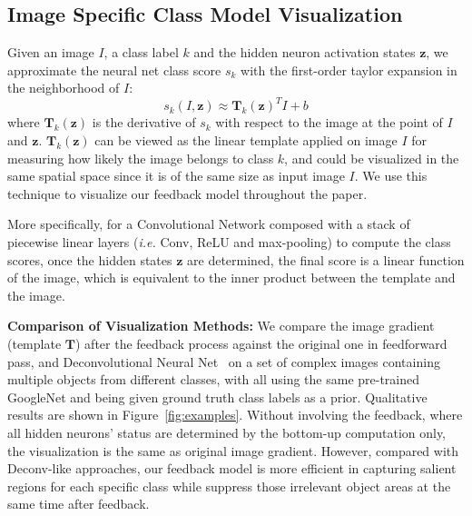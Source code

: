 \subsection{Image Specific Class Model Visualization}
\label{subsec:visualization}
Given an image $I$, a class label $k$ and the hidden neuron activation states $\mathbf{z}$, we approximate the neural net class score $s_k$ with the first-order taylor expansion in the neighborhood of $I$:
\begin{equation}
  s_k(I, \mathbf{z}) \approx  \mathbf{T}_k(\mathbf{z})^T I + b
\end{equation}
where $\mathbf{T}_k(\mathbf{z})$ is the derivative of $s_k$ with respect to the image at the point of $I$ and $\mathbf{z}$. $\mathbf{T}_k(\mathbf{z})$ can be viewed as the linear template applied on image $I$ for measuring how likely the image belongs to class $k$, and could be visualized in the same spatial space since it is of the same size as input image $I$.
We use this technique to visualize our feedback model throughout the paper.

More specifically, for a Convolutional Network composed with a stack of piecewise linear layers (\emph{i.e.} Conv, ReLU and max-pooling) to compute the class scores, once the hidden states $\mathbf{z}$ are determined, the final score is a linear function of the image, which is equivalent to the inner product between the template and the image.

\textbf{Comparison of Visualization Methods:} We compare the image gradient (template $\mathbf{T}$) after the feedback process against the original one in feedforward pass, and Deconvolutional Neural Net~\cite{zeiler2014visualizing} on a set of complex images containing multiple objects from different classes, with all using the same pre-trained GoogleNet and being given ground truth class labels as a prior. Qualitative results are shown in Figure~\ref{fig:examples}. Without involving the feedback, where all hidden neurons' status are determined by the bottom-up computation only, the visualization is the same as original image gradient. However, compared with Deconv-like approaches, our feedback model is more efficient in capturing salient regions for each specific class while suppress those irrelevant object areas at the same time after feedback.

